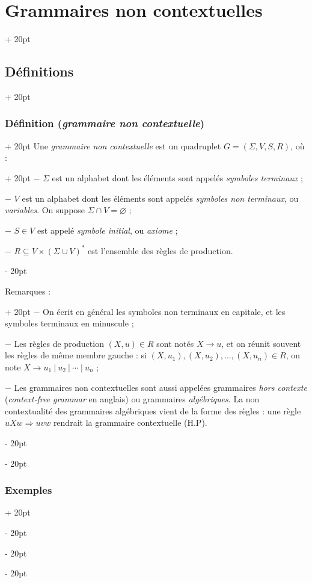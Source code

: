 \documentclass[a4paper, 12pt, twoside]{article}
\newcommand{\lr}[1]{\left( #1 \right)}
\newcommand{\ind}[1][20pt]{\advance\leftskip + #1}
\newcommand{\deind}[1][20pt]{\advance\leftskip - #1}
\newenvironment{indt}[2][20pt]{#2 \par \ind[#1]}{\par \deind} %
\begin{document}
\begin{indt}{\section{Grammaires non contextuelles}}
\begin{indt}{\subsection{Définitions}}
            \begin{indt}{\subsubsection{Définition (\textit{grammaire non contextuelle})}}
                \begin{indt}{Une \emph{grammaire non contextuelle} est un quadruplet $G = \lr{\Sigma, V, S, R}$, où :}
                    $-$ $\Sigma$ est un alphabet dont les éléments sont appelés \emph{symboles terminaux} ;

                    $-$ $V$ est un alphabet dont les éléments sont appelés \emph{symboles non terminaux}, ou \emph{variables}.
                    On suppose $\Sigma \cap V = \varnothing$ ;

                    $-$ $S \in V$ est appelé \emph{symbole initial}, ou \emph{axiome} ;

                    $-$ $R \subseteq V \times \lr{\Sigma \cup V}^*$ est l'ensemble des règles de production.
                \end{indt}

                \vspace{12pt}
                
                \begin{indt}{Remarques :}
                    $-$ On écrit en général les symboles non terminaux en capitale, et les symboles terminaux en minuscule ;

                    $-$ Les règles de production $(X, u) \in R$ sont notés $X \rightarrow u$, et on réunit souvent les règles de même membre gauche : si $(X, u_1), (X, u_2), \ldots, (X, u_n) \in R$, on note $X \rightarrow u_1 \ |\ u_2 \ |\ \cdots \ |\ u_n$ ;

                    $-$ Les grammaires non contextuelles sont aussi appelées grammaires \textit{hors contexte} (\textit{context-free grammar} en anglais) ou grammaires \textit{algébriques}.
                    La non contextualité des grammaires algébriques vient de la forme des règles : une règle $uXw \Rightarrow uvw$ rendrait la grammaire contextuelle (H.P).
                \end{indt}
            \end{indt}

            \vspace{12pt}
            
            \begin{indt}{\subsubsection{Exemples}}
                \label{3.1.3}


\end{indt}
\end{indt}
\end{indt}
\end{document}

